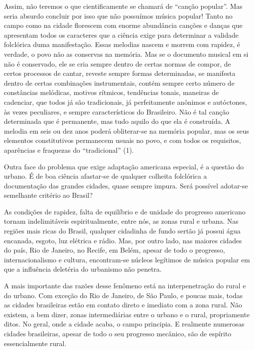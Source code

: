 Assim, não teremos o que cientificamente se chamará de ``canção
popular''. Mas seria absurdo concluir por isso que não possuímos música
popular! Tanto no campo como na cidade florescem com enorme abundância
canções e danças que apresentam todos os caracteres que a ciência exige
para determinar a validade folclórica duma manifestação. Essas melodias
nascem e morrem com rapidez, é verdade, o povo não as conservas na
memória. Mas se o documento musical em si não é conservado, ele se cria
sempre dentro de certas normas de compor, de certos processos de cantar,
reveste sempre formas determinadas, se manifesta dentro de certas
combinações instrumentais, contém sempre certo número de constâncias
melódicas, motivos rítmicos, tendências tonais, maneiras de cadenciar,
que todos já são tradicionais, já perfeitamente anônimos e autóctones,
às vezes peculiares, e sempre característicos do Brasileiro. Não é tal
canção determinada que é permanente, mas tudo aquilo do que ela é
construída. A melodia em seis ou dez anos poderá obliterar-se na memória
popular, mas os seus elementos constitutivos permanecem usuais no povo,
e com todos os requisitos, aparências e fraquezas do ``tradicional''
(1).

Outra face do problema que exige adaptação americana especial, é a
questão do urbano. É de boa ciência afastar-se de qualquer colheita
folclórica a documentação das grandes cidades, quase sempre impura. Será
possível adotar-se semelhante critério ao Brasil?

As condições de rapidez, falta de equilíbrio e de unidade do progresso
americano tornam indelimitáveis espiritualmente, entre nós, as zonas
rural e urbana. Nas regiões mais ricas do Brasil, qualquer cidadinha de
fundo sertão já possui água encanada, esgoto, luz elétrica e rádio. Mas,
por outro lado, nas maiores cidades do país, Rio de Janeiro, no Recife,
em Belém, apesar de todo o progresso, internacionalismo e cultura,
encontram-se núcleos legítimos de música popular em que a influência
deletéria do urbanismo não penetra.

A mais importante das razões desse fenômeno está na interpenetração do
rural e do urbano. Com exceção do Rio de Janeiro, de São Paulo, e poucas
mais, todas as cidades brasileiras estão em contato direto e imediato
com a zona rural. Não existem, a bem dizer, zonas intermediárias entre o
urbano e o rural, propriamente ditos. No geral, onde a cidade acaba, o
campo principia. E realmente numerosas cidades brasileiras, apesar de
todo o seu progresso mecânico, são de espírito essencialmente rural.

